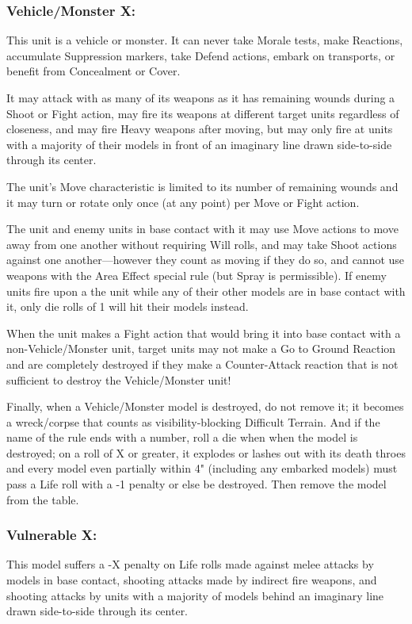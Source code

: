 \begin{multicols}{2}
\subsubsection*{Vehicle/Monster X:} This unit is a vehicle or monster. It can never take Morale tests, make Reactions, accumulate Suppression markers, take Defend actions, embark on transports, or benefit from Concealment or Cover.

It may attack with as many of its weapons as it has remaining wounds during a Shoot or Fight action, may fire its weapons at different target units regardless of closeness, and may fire Heavy weapons after moving, but may only fire at units with a majority of their models in front of an imaginary line drawn side-to-side through its center.

The unit's Move characteristic is limited to its number of remaining wounds and it may turn or rotate only once (at any point) per Move or Fight action.

The unit and enemy units in base contact with it may use Move actions to move away from one another without requiring Will rolls, and may take Shoot actions against one another—however they count as moving if they do so, and cannot use weapons with the Area Effect special rule (but Spray is permissible). If enemy units fire upon a the unit while any of their other models are in base contact with it, only die rolls of 1 will hit their models instead.

When the unit makes a Fight action that would bring it into base contact with a non-Vehicle/Monster unit, target units may not make a Go to Ground Reaction and are completely destroyed if they make a Counter-Attack reaction that is not sufficient to destroy the Vehicle/Monster unit!

Finally, when a Vehicle/Monster model is destroyed, do not remove it; it becomes a wreck/corpse that counts as visibility-blocking Difficult Terrain. And if the name of the rule ends with a number, roll a die when when the model is destroyed; on a roll of X or greater, it explodes or lashes out with its death throes and every model even partially within 4" (including any embarked models) must pass a Life roll with a -1 penalty or else be destroyed. Then remove the model from the table.

\subsubsection*{Vulnerable X:} This model suffers a -X penalty on Life rolls made against melee attacks by models in base contact, shooting attacks made by indirect fire weapons, and shooting attacks by units with a majority of models behind an imaginary line drawn side-to-side through its center.





\end{multicols}
